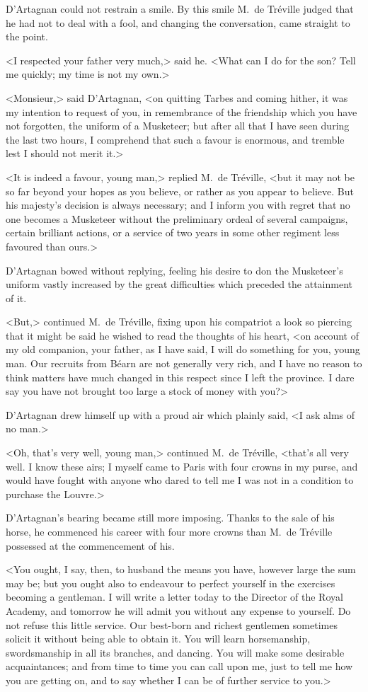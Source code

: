 D'Artagnan could not restrain a smile. By this smile M.~de Tréville judged that he had not to deal with a fool, and changing the conversation, came straight to the point. 

<I respected your father very much,> said he. <What can I do for the son? Tell me quickly; my time is not my own.> 

<Monsieur,> said D'Artagnan, <on quitting Tarbes and coming hither, it was my intention to request of you, in remembrance of the friendship which you have not forgotten, the uniform of a Musketeer; but after all that I have seen during the last two hours, I comprehend that such a favour is enormous, and tremble lest I should not merit it.> 

<It is indeed a favour, young man,> replied M.~de Tréville, <but it may not be so far beyond your hopes as you believe, or rather as you appear to believe. But his majesty's decision is always necessary; and I inform you with regret that no one becomes a Musketeer without the preliminary ordeal of several campaigns, certain brilliant actions, or a service of two years in some other regiment less favoured than ours.> 

D'Artagnan bowed without replying, feeling his desire to don the Musketeer's uniform vastly increased by the great difficulties which preceded the attainment of it. 

<But,> continued M.~de Tréville, fixing upon his compatriot a look so piercing that it might be said he wished to read the thoughts of his heart, <on account of my old companion, your father, as I have said, I will do something for you, young man. Our recruits from Béarn are not generally very rich, and I have no reason to think matters have much changed in this respect since I left the province. I dare say you have not brought too large a stock of money with you?> 

D'Artagnan drew himself up with a proud air which plainly said, <I ask alms of no man.> 

<Oh, that's very well, young man,> continued M.~de Tréville, <that's all very well. I know these airs; I myself came to Paris with four crowns in my purse, and would have fought with anyone who dared to tell me I was not in a condition to purchase the Louvre.> 

D'Artagnan's bearing became still more imposing. Thanks to the sale of his horse, he commenced his career with four more crowns than M.~de Tréville possessed at the commencement of his. 

<You ought, I say, then, to husband the means you have, however large the sum may be; but you ought also to endeavour to perfect yourself in the exercises becoming a gentleman. I will write a letter today to the Director of the Royal Academy, and tomorrow he will admit you without any expense to yourself. Do not refuse this little service. Our best-born and richest gentlemen sometimes solicit it without being able to obtain it. You will learn horsemanship, swordsmanship in all its branches, and dancing. You will make some desirable acquaintances; and from time to time you can call upon me, just to tell me how you are getting on, and to say whether I can be of further service to you.> 

